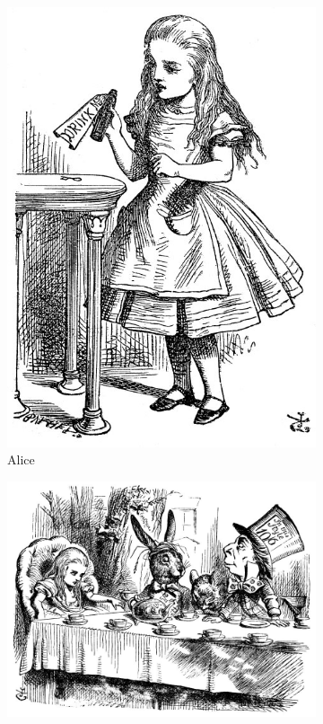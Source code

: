 \documentclass{article}
\begin{document}
\begin{figure}[b]
\centering
\begin{subfigure}{0.2\textwidth}
\includegraphics[width=\textwidth]{alice}
\caption{Alice}
\label{subfig:alice}
\end{subfigure}
\quad
\begin{subfigure}{0.35\textwidth}
\includegraphics[width=\textwidth]{teaparty}

\end{subfigure}
\end{figure}
\end{document}
